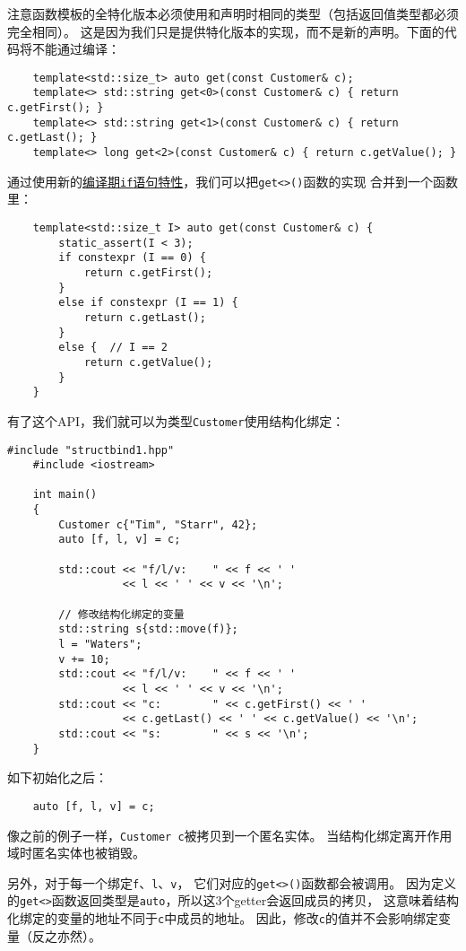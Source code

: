 注意函数模板的全特化版本必须使用和声明时相同的类型（包括返回值类型都必须完全相同）。
这是因为我们只是提供特化版本的实现，而不是新的声明。下面的代码将不能通过编译：
\begin{lstlisting}
    template<std::size_t> auto get(const Customer& c);
    template<> std::string get<0>(const Customer& c) { return c.getFirst(); }
    template<> std::string get<1>(const Customer& c) { return c.getLast(); }
    template<> long get<2>(const Customer& c) { return c.getValue(); }
\end{lstlisting}
通过使用新的\hyperref[ch10]{编译期\texttt{if}语句特性}，我们可以把\texttt{get<>()}函数的实现
合并到一个函数里：
\begin{lstlisting}
    template<std::size_t I> auto get(const Customer& c) {
        static_assert(I < 3);
        if constexpr (I == 0) {
            return c.getFirst();
        }
        else if constexpr (I == 1) {
            return c.getLast();
        }
        else {  // I == 2
            return c.getValue();
        }
    }
\end{lstlisting}
有了这个API，我们就可以为类型\texttt{Customer}使用结构化绑定：
\begin{lstlisting}[frame=single, title=lang/structbind1.cpp]
    #include "structbind1.hpp"
    #include <iostream>

    int main()
    {
        Customer c{"Tim", "Starr", 42};
        auto [f, l, v] = c;

        std::cout << "f/l/v:    " << f << ' '
                  << l << ' ' << v << '\n';

        // 修改结构化绑定的变量
        std::string s{std::move(f)};
        l = "Waters";
        v += 10;
        std::cout << "f/l/v:    " << f << ' '
                  << l << ' ' << v << '\n';
        std::cout << "c:        " << c.getFirst() << ' '
                  << c.getLast() << ' ' << c.getValue() << '\n';
        std::cout << "s:        " << s << '\n';
    }
\end{lstlisting}
如下初始化之后：
\begin{lstlisting}
    auto [f, l, v] = c;
\end{lstlisting}
像之前的例子一样，\texttt{Customer c}被拷贝到一个匿名实体。
当结构化绑定离开作用域时匿名实体也被销毁。

另外，对于每一个绑定\texttt{f}、\texttt{l}、\texttt{v}，
它们对应的\texttt{get<>()}函数都会被调用。
因为定义的\texttt{get<>}函数返回类型是\texttt{auto}，所以这3个getter会返回成员的拷贝，
这意味着结构化绑定的变量的地址不同于\texttt{c}中成员的地址。
因此，修改\texttt{c}的值并不会影响绑定变量（反之亦然）。

